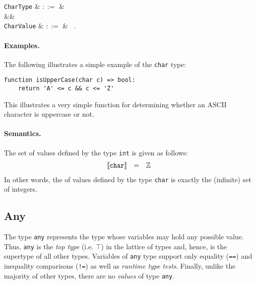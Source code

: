 \begin{syntax}
  \verb+CharType+ & $::=$ &  \\
  &&\\
  \verb+CharValue+ & $::=$ & \ .\  \\
\end{syntax}

\paragraph{Examples.}  The following illustrates a simple example of the \lstinline{char} type:

\begin{lstlisting}
function isUpperCase(char c) => bool:
    return 'A' <= c && c <= 'Z'
\end{lstlisting}
This illustrates a very simple function for determining whether an ASCII character is uppercase or not.

\paragraph{Semantics.}  The set of values defined by the type \lstinline{int} is given as follows:
\begin{displaymath}
\begin{array}{rcl}
\llbracket{\tt char}\rrbracket & = & \mathbb{Z}\\
\end{array}
\end{displaymath}
In other words, the of values defined by the type \lstinline{char} is exactly the (infinite) set of integers.


\subsection{Any}

The type \lstinline{any} represents the type whose variables may hold any possible value.  Thus, \lstinline{any} is the {\em top type} (i.e. $\top$) in the lattice of types and, hence, is the supertype of all other types.  Variables of \lstinline{any} type support only equality (\lstinline{==}) and inequality comparisons (\lstinline{!=}) as well as {\em runtime type tests}.  Finally, unlike the majority of other types, there are no {\em values} of type \lstinline{any}.

